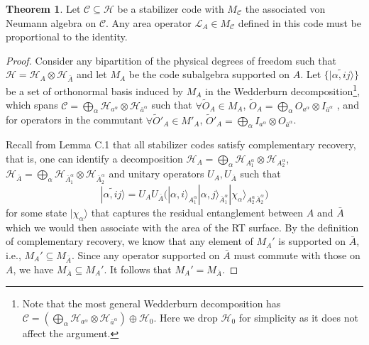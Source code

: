 \documentclass[a4paper,11pt]{article}
\theoremstyle{definition}
\newtheorem{theorem}{Theorem}[section]
\numberwithin{equation}{section}
\begin{document}
\begin{theorem}\label{thm:1}
Let $\mathcal{C}\subseteq \mathcal{H}$ be a stabilizer code with $M_{\mathcal{C}}$ the associated von Neumann algebra on $\mathcal{C}$. Any area operator ${\mathcal{L}}_{A}\in M_{\mathcal{C}}$ defined in this code must be proportional to the identity.
\end{theorem}
\begin{proof}
Consider any bipartition  of the physical degrees of freedom such that $\mathcal{H}=\mathcal{H}_A\otimes \mathcal{H}_{\bar{A}}$ and let $M_A$ be the code subalgebra supported on $A$. Let $\{|\widetilde{\alpha,ij}\rangle\}$ be a set of orthonormal basis  induced by $M_A$ in the Wedderburn decomposition\footnote{Note that the most general Wedderburn decomposition has $\mathcal{C}=(\bigoplus_{\alpha}\mathcal{H}_{a^{\alpha}}\otimes \mathcal{H}_{\bar{a}^{\alpha}})\oplus\mathcal{H}_0$. Here we drop $\mathcal{H}_0$ for simplicity as it does not affect the argument.}, which spans $\mathcal{C}=\bigoplus_{\alpha}\mathcal{H}_{a^{\alpha}}\otimes \mathcal{H}_{\bar{a}^{\alpha}}$ such that $\forall\tilde{O}_A\in M_A$, $\tilde{O}_A=\bigoplus_{\alpha}O_{a^{\alpha}}\otimes I_{\bar{a}^{\alpha}}$ , and for operators in the commutant $\forall \tilde{O}'_A\in M'_{{A}}$, $\tilde{O}'_A=\bigoplus_{\alpha}I_{{a}^{\alpha}}\otimes O_{\bar{a}^{\alpha}}$. 

Recall from \cite{Pollack:2021yij} Lemma C.1 that all stabilizer codes satisfy complementary recovery, that is, one can identify a decomposition $\mathcal{H}_A=\bigoplus_{\alpha}\mathcal{H}_{A_1^{\alpha}}\otimes\mathcal{H}_{A_2^{\alpha}}$,$\mathcal{H}_{\bar{A}}=\bigoplus_{\alpha}\mathcal{H}_{\bar{A}_1^{\alpha}}\otimes\mathcal{H}_{\bar{A}_2^{\alpha}}$
and unitary operators $U_A,U_{\bar{A}}$ such that
\begin{equation}
    |\widetilde{\alpha,ij}\rangle = U_AU_{\bar{A}} \Big(|\alpha,i\rangle_{A_1^{\alpha}}|\alpha,j\rangle_{\bar{A}_1^{\alpha}}|\chi_{\alpha}\rangle_{A_2^{\alpha}\bar{A}_2^{\alpha}}\Big)
\end{equation} 
for some state $|\chi_{\alpha}\rangle$ that captures the residual entanglement between $A$ and $\bar{A}$ which we would then associate with the area of the RT surface.
By the definition of complementary recovery\cite{Harlow:2016vwg}, we know that any element of $M_A'$ is supported on $\bar{A}$, i.e., $M_A'\subseteq M_{\bar{A}}$. Since any operator supported on $\bar{A}$ must commute with those on $A$, we have $M_{\bar{A}}\subseteq M_A'$. It follows that $M_A'=M_{\bar{A}}$.


\end{proof}
\end{document}
